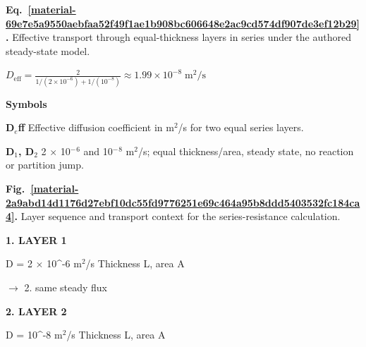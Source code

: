 \documentclass[11pt,a4paper]{article}
\begin{document}
\par\medskip
\noindent\begin{minipage}{\linewidth}
\label{material-69e7e5a9550aebfaa52f49f1ae1b908bc606648e2ac9cd574df907de3ef12b29}
\noindent\textbf{Eq.~\ref*{material-69e7e5a9550aebfaa52f49f1ae1b908bc606648e2ac9cd574df907de3ef12b29}.} Effective transport through equal-thickness layers in series under the authored steady-state model.\par\nopagebreak
\begin{center}\begin{adjustbox}{max width=\linewidth}$\displaystyle D_{\mathrm{eff}}=\frac{2}{1/(2\times10^{-6})+1/(10^{-8})}\approx1.99\times10^{-8}\;\mathrm{m^2/s}$\end{adjustbox}\end{center}

\par\noindent\textbf{Symbols}

\par\noindent\textbf{D\ensuremath{{}_e}ff} Effective diffusion coefficient in m\ensuremath{{}^2}/s for two equal series layers.

\par\noindent\textbf{D\ensuremath{{}_1}, D\ensuremath{{}_2}} 2 \ensuremath{\times} 10\ensuremath{{}^-}\ensuremath{{}^6} and 10\ensuremath{{}^-}\ensuremath{{}^8} m\ensuremath{{}^2}/s; equal thickness/area, steady state, no reaction or partition jump.

\end{minipage}\par
\medskip

\par\medskip
\Needspace{10cm}
\label{material-2a9abd14d1176d27ebf10dc55fd9776251e69c464a95b8ddd5403532fc184ca4}
\noindent\textbf{Fig.~\ref*{material-2a9abd14d1176d27ebf10dc55fd9776251e69c464a95b8ddd5403532fc184ca4}.} Layer sequence and transport context for the series-resistance calculation.\par\nopagebreak
\par\medskip\noindent\textcolor{pcd1}{\textbf{1. LAYER 1}}\par
D = 2 \ensuremath{\times} 10\textasciicircum{}-6 m\ensuremath{{}^2}/s
Thickness L, area A

\par\noindent $\longrightarrow$ 2. same steady flux
\par\medskip\noindent\textcolor{pcd2}{\textbf{2. LAYER 2}}\par
D = 10\textasciicircum{}-8 m\ensuremath{{}^2}/s
Thickness L, area A
\end{document}
